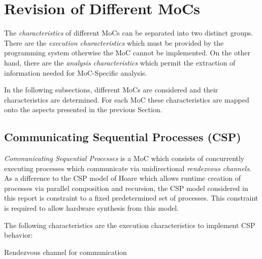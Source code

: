 \section{Revision of Different MoCs}\label{revision-of-mocs}

The \emph{characteristics} of different MoCs can be separated into two distinct groups.
There are the \emph{execution characteristics} which must be provided by
the programming system otherwise the MoC cannot be implemented.
On the other hand, there are the \emph{analysis characteristics} which
permit the extraction of information needed for MoC-Specific analysis.

In the following subsections, different MoCs are considered and their
characteristics are determined. For each MoC these characteristics are
mapped onto the aspects presented in the previous Section.

\subsection{Communicating Sequential Processes (CSP)}
\emph{Communicating Sequential Processes} \cite{csphoare:1985}
is a MoC which consists of concurrently executing processes
which communicate via unidirectional \emph{rendezvous channels}.
As a difference to the CSP model of Hoare \cite{csphoare:1985}
which allows runtime creation of processes via parallel
composition and recursion, the CSP model considered in this report
is constraint to a fixed predetermined set of processes.
This constraint is required to allow hardware synthesis from this
model.

The following characteristics are the execution characteristics to
implement CSP behavior:

\begin{characteristic}\label{characteristic-csp-rendezvous}
  Rendezvous channel for communication
\end{characteristic}

